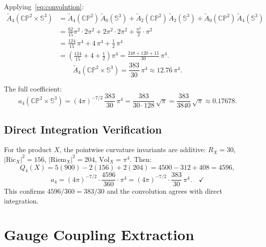 \documentclass[11pt]{article}
\newcommand{\CP}{\mathbb{CP}}
\newcommand{\Sph}{\mathbb{S}}
\newcommand{\Ric}{\mathrm{Ric}}
\newcommand{\Riem}{\mathrm{Riem}}
\newcommand{\Vol}{\mathrm{Vol}}
\begin{document}
Applying~\eqref{eq:convolution}:
\begin{align}
  \widetilde{A}_4(\CP^2 {\times} \Sph^3)
  &= \widetilde{A}_4(\CP^2)\,\widetilde{A}_0(\Sph^3)
   + \widetilde{A}_2(\CP^2)\,\widetilde{A}_2(\Sph^3)
   + \widetilde{A}_0(\CP^2)\,\widetilde{A}_4(\Sph^3) \\
  &= \frac{62}{15}\pi^2 \cdot 2\pi^2
   + 2\pi^2 \cdot 2\pi^2
   + \frac{\pi^2}{2} \cdot \pi^2 \\
  &= \frac{124}{15}\,\pi^4 + 4\,\pi^4 + \frac{1}{2}\,\pi^4 \\
  &= \left(\frac{124}{15} + 4 + \frac{1}{2}\right)\pi^4
   = \frac{248 + 120 + 15}{30}\,\pi^4.
\end{align}
\begin{equation}
  \boxed{\widetilde{A}_4(\CP^2 \times \Sph^3)
  = \frac{383}{30}\,\pi^4 \approx 12.7\overline{6}\,\pi^4.}
\end{equation}

The full coefficient:
\begin{equation}
  a_4(\CP^2 \times \Sph^3)
  = (4\pi)^{-7/2}\,\frac{383}{30}\,\pi^4
  = \frac{383}{30 \cdot 128}\,\sqrt{\pi}
  = \frac{383}{3840}\,\sqrt{\pi}
  \approx 0.17678.
\end{equation}

\subsection{Direct Integration Verification}

For the product $X$, the pointwise curvature invariants are additive:
$R_X = 30$, $|\Ric_X|^2 = 156$, $|\Riem_X|^2 = 204$, $\Vol_X = \pi^4$. Then:
\begin{equation}
  Q_4(X) = 5(900) - 2(156) + 2(204) = 4500 - 312 + 408 = 4596,
\end{equation}
\begin{equation}
  a_4 = (4\pi)^{-7/2} \cdot \frac{4596}{360} \cdot \pi^4
  = (4\pi)^{-7/2} \cdot \frac{383}{30}\,\pi^4. \quad\checkmark
\end{equation}
This confirms $4596/360 = 383/30$ and the convolution agrees with direct integration.

\section{Gauge Coupling Extraction}
\end{document}
